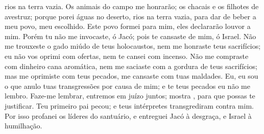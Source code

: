 {{} rios na terra vazia.
  Os animais do campo me honrarão; os chacais e os filhotes de avestruz; porque porei águas no deserto, rios na terra vazia, para dar de beber a meu povo, meu escolhido.
  Este povo formei para mim, eles declararão louvor a mim.
  Porém tu não me invocaste, ó Jacó; pois te cansaste de mim, ó Israel.
  Não me trouxeste o gado miúdo de teus holocaustos, nem me honraste
{} teus sacrifícios; eu não vos oprimi com ofertas, nem te cansei com incenso.
  Não me compraste com dinheiro cana aromática, nem me saciaste com a gordura de teus sacrifícios; mas me oprimiste com teus pecados,
{} me cansaste com tuas maldades.
  Eu, eu sou o que anulo tuas transgressões por causa de mim; e te teus pecados eu não me lembro.
  Faze-me lembrar, entremos em juízo juntos; mostra
{}, para que possas te justificar.
  Teu primeiro pai pecou; e teus intérpretes transgrediram contra mim.
  Por isso profanei os líderes do santuário, e entreguei Jacó à desgraça, e Israel à humilhação.
\par }

